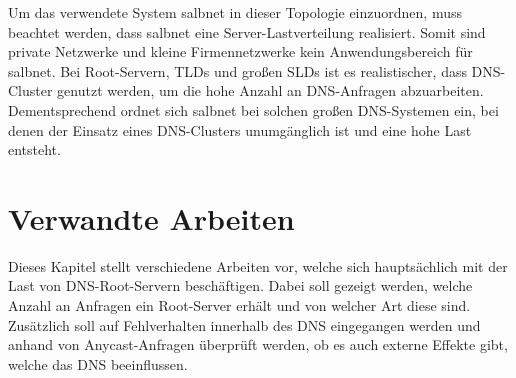 \documentclass[a4paper, 12pt, BCOR10mm, DIV12, toc=bibliography, toc=listof, german]{scrbook}
\begin{document}
			Um das verwendete System salbnet in dieser Topologie einzuordnen, muss beachtet werden, dass
			salbnet eine Server-Lastverteilung realisiert. Somit sind private Netzwerke und kleine
			Firmennetzwerke kein Anwendungsbereich für salbnet. Bei Root-Servern, TLDs und großen SLDs ist
			es realistischer, dass DNS-Cluster genutzt werden, um die hohe Anzahl an DNS-Anfragen
			abzuarbeiten. Dementsprechend ordnet sich salbnet bei solchen großen DNS-Systemen ein, bei denen
			der Einsatz eines DNS-Clusters unumgänglich ist und eine hohe Last entsteht.
		



	\chapter{Verwandte Arbeiten} %
	\label{cha:arbeiten}

	Dieses Kapitel stellt verschiedene Arbeiten vor, welche sich hauptsächlich mit der Last von
	DNS-Root-Servern beschäftigen. Dabei soll gezeigt werden, welche Anzahl an Anfragen ein
	Root-Server erhält und von welcher Art diese sind. Zusätzlich soll auf Fehlverhalten innerhalb des
	DNS eingegangen werden und anhand von Anycast-Anfragen überprüft werden, ob es auch externe
	Effekte gibt, welche das DNS beeinflussen.
\end{document}
